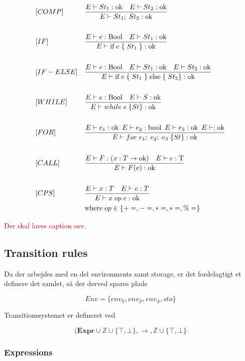 \begin{align*}
&[COMP] & &\frac{E \vdash St_1 : \text{ok}\quad E \vdash St_2 : \text{ok}}{E \vdash St_1;\;St_2 : \text{ok}}\\\\
&[IF] & &\frac{E \vdash e : \text{Bool}\quad E \vdash St_1 : \text{ok}}{E \vdash \text{if}\; e\; \{\; St_1\; \} : \text{ok}}\\\\
&[IF-ELSE] & &\frac{E \vdash e : \text{Bool}\quad E \vdash St_1 : \text{ok}\quad E \vdash St_2 : \text{ok}}{E \vdash \text{if}\; e\; \{\; St_1\; \}\; \text{else}\; \{\;St_2\} : \text{ok}}\\\\
&[WHILE] & &\frac{E \vdash e : \text{Bool}\quad E \vdash S : \text{ok}}{E \vdash while\; e\; \{St\} : \text{ok}}\\\\
&[FOR] & &\frac{E \vdash e_1 : \text{ok}\enskip E \vdash e_2 : \text{bool}\enskip E \vdash e_3 : \text{ok}\enskip E \vdash : \text{ok}}{E \vdash for\; e_1;\; e_2;\; e_3\; \{St\} : \text{ok}}\\\\
&[CALL] & &\frac{E \vdash F : (x : T \rightarrow \text{ok})\quad E \vdash e : \text{T}}{E \vdash F(e) : \text{ok}}\\\\
&[CPS] & &\frac{E \vdash x : T\quad E \vdash e : T}{E \vdash x\; op\; e : \text{ok}}\\
& & &\text{where}\; op \in \{+=, -=, *=, *=, \%=\}
\end{align*}

\noindent \textcolor{red}{Der skal laves caption osv.}

\subsection{Transition rules}
Da der arbejdes med en del environments samt storage, er det fordelagtigt et definere det samlet, så der derved spares plads

$$ Env = \{env_V, env_F, env_S, sto\} $$

\noindent Transitionssystemet er defineret ved

$$ (\textbf{Expr} \cup \mathds{Z} \cup \{\top, \bot\}, \rightarrow, \mathds{Z} \cup \{\top, \bot\} $$

\subsubsection{Expressions}

